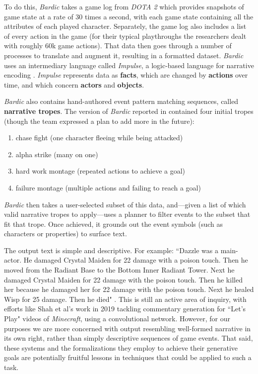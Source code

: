 To do this, \textit{Bardic} takes a game log from \textit{DOTA 2} which provides snapshots of game state at a rate of 30 times a second, with each game state containing all the attributes of each played character. Separately, the game log also includes a list of every action in the game (for their typical playthroughs the researchers dealt with roughly 60k game actions). That data then goes through a number of processes to translate and augment it, resulting in a formatted dataset. \textit{Bardic} uses an intermediary language called \textit{Impulse}, a logic-based language for narrative encoding \cite{eger2015impulse}. \textit{Impulse} represents data as \textbf{facts}, which are changed by \textbf{actions} over time, and which concern \textbf{actors} and \textbf{objects}.

\textit{Bardic} also contains hand-authored event pattern matching sequences, called \textbf{narrative tropes}. The version of \textit{Bardic} reported in \cite{barot2017bardic} contained four initial tropes (though the team expressed a plan to add more in the future): 

\begin{enumerate}
    \item chase fight (one character fleeing while being attacked)
    \item alpha strike (many on one)
    \item hard work montage (repeated actions to achieve a goal)
    \item failure montage (multiple actions and failing to reach a goal)
\end{enumerate}

\textit{Bardic} then takes a user-selected subset of this data, and---given a list of which valid narrative tropes to apply---uses a planner to filter events to the subset that fit that trope. Once achieved, it grounds out the event symbols (such as characters or properties) to surface text.

The output text is simple and descriptive. For example: ``Dazzle was a main-actor. He damaged Crystal Maiden for 22 damage with a poison touch. Then he moved from the Radiant Base to the Bottom Inner Radiant Tower. Next he damaged Crystal Maiden for 22 damage with the poison touch. Then he killed her because he damaged her for 22 damage with the poison touch. Next he healed Wisp for 25 damage. Then he died" \cite{barot2017bardic}.
This is still an active area of inquiry, with efforts like Shah et al's work in 2019 \cite{shah} tackling commentary generation for ``Let's Play" videos of \textit{Minecraft}, using a convolutional network. However, for our purposes we are more concerned with output resembling well-formed narrative in its own right, rather than simply descriptive sequences of game events. That said, these systems and the formalizations they employ to achieve their generative goals are potentially fruitful lessons in techniques that could be applied to such a task.

